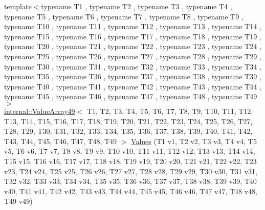 \begin{DoxyCompactItemize}
\item 
{\footnotesize template$<$typename T1 , typename T2 , typename T3 , typename T4 , typename T5 , typename T6 , typename T7 , typename T8 , typename T9 , typename T10 , typename T11 , typename T12 , typename T13 , typename T14 , typename T15 , typename T16 , typename T17 , typename T18 , typename T19 , typename T20 , typename T21 , typename T22 , typename T23 , typename T24 , typename T25 , typename T26 , typename T27 , typename T28 , typename T29 , typename T30 , typename T31 , typename T32 , typename T33 , typename T34 , typename T35 , typename T36 , typename T37 , typename T38 , typename T39 , typename T40 , typename T41 , typename T42 , typename T43 , typename T44 , typename T45 , typename T46 , typename T47 , typename T48 , typename T49 $>$ }\\\mbox{\hyperlink{classtesting_1_1internal_1_1ValueArray49}{internal\+::\+Value\+Array49}}$<$ T1, T2, T3, T4, T5, T6, T7, T8, T9, T10, T11, T12, T13, T14, T15, T16, T17, T18, T19, T20, T21, T22, T23, T24, T25, T26, T27, T28, T29, T30, T31, T32, T33, T34, T35, T36, T37, T38, T39, T40, T41, T42, T43, T44, T45, T46, T47, T48, T49 $>$ \mbox{\hyperlink{namespacetesting_a034785cd0f04e5f5ec9e16c1cad5ccde}{Values}} (T1 v1, T2 v2, T3 v3, T4 v4, T5 v5, T6 v6, T7 v7, T8 v8, T9 v9, T10 v10, T11 v11, T12 v12, T13 v13, T14 v14, T15 v15, T16 v16, T17 v17, T18 v18, T19 v19, T20 v20, T21 v21, T22 v22, T23 v23, T24 v24, T25 v25, T26 v26, T27 v27, T28 v28, T29 v29, T30 v30, T31 v31, T32 v32, T33 v33, T34 v34, T35 v35, T36 v36, T37 v37, T38 v38, T39 v39, T40 v40, T41 v41, T42 v42, T43 v43, T44 v44, T45 v45, T46 v46, T47 v47, T48 v48, T49 v49)
\item 

\end{DoxyCompactItemize}
